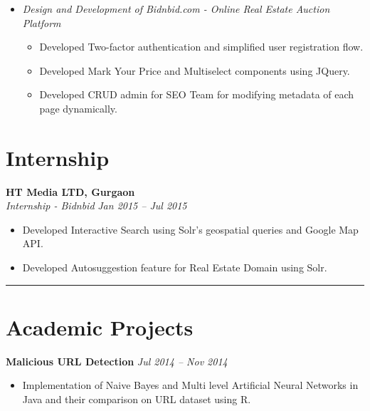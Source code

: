 \documentclass[margin,line]{resume}
\begin{document}
\begin{resume}
\begin{itemize}
    \item \textsl{Design and Development of Bidnbid.com - Online Real Estate Auction Platform}
        \begin{itemize}
            \item Developed​ Two-factor authentication​ and simplified user registration flow.
            \item Developed Mark Your Price and Multiselect components using JQuery.
            \item Developed CRUD admin for SEO Team for modifying metadata of each page dynamically.
        \end{itemize}

        


    \end{itemize}

    \section{\mysidestyle Internship}


    \textbf{HT Media LTD, Gurgaon}\\
    \textsl{Internship - Bidnbid} \hfill \textsl{Jan 2015 -- Jul 2015} \vspace{0mm}\\\vspace{0mm}%
    	\begin{itemize}
			\item Developed Interactive Search using Solr's geospatial queries and Google Map API.
            \item Developed ​Autosuggestion ​feature for Real Estate Domain using Solr.
        \end{itemize}
    	
    	\newpage
    	\noindent\rule{15.3cm}{0.4pt}
		\vspace{2mm}
    \section{\mysidestyle Academic Projects}
    \textbf{Malicious URL Detection} \hfill \textsl{Jul 2014 -- Nov 2014} \vspace{0mm}\\\vspace{0mm}%
       \begin{itemize}
	        \item Implementation of Naive Bayes and Multi level Artificial Neural Networks in Java and their comparison on URL dataset using R.
       \end{itemize}


\end{resume}
\end{document}
